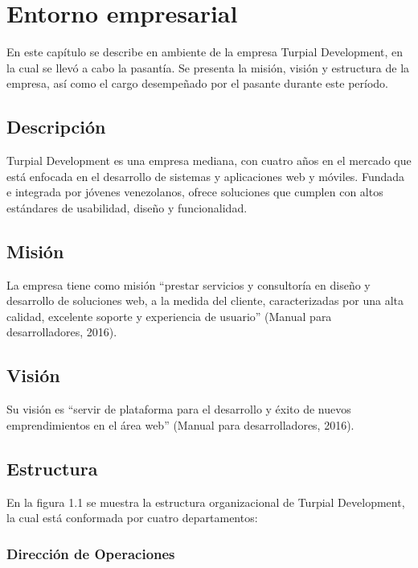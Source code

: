\chapter{\textbf{Entorno empresarial}}

\thispagestyle{empty}

En este capítulo se describe en ambiente de la empresa Turpial Development, en
la cual se llevó a cabo la pasantía. Se presenta la misión, visión y estructura
de la empresa, así como el cargo desempeñado por el pasante durante este
período.


\section{Descripción}

Turpial Development es una empresa mediana, con cuatro años en el mercado que
está enfocada en el desarrollo de sistemas y aplicaciones web y móviles.
Fundada e integrada por jóvenes venezolanos,  ofrece soluciones que cumplen con
altos estándares de usabilidad, diseño y funcionalidad.

\section{Misión}

La empresa tiene como misión “prestar servicios y consultoría en diseño y
desarrollo de soluciones web, a la medida del cliente, caracterizadas por una
alta calidad, excelente soporte y experiencia de usuario” (Manual para
desarrolladores, 2016).


\section{Visión}

Su visión es “servir de plataforma para el desarrollo y éxito de nuevos
emprendimientos en el área web” (Manual para desarrolladores, 2016).

\section{Estructura}

En la figura 1.1 se muestra la estructura organizacional de Turpial
Development, la cual está conformada por cuatro departamentos:

\subsection*{Dirección de Operaciones}


